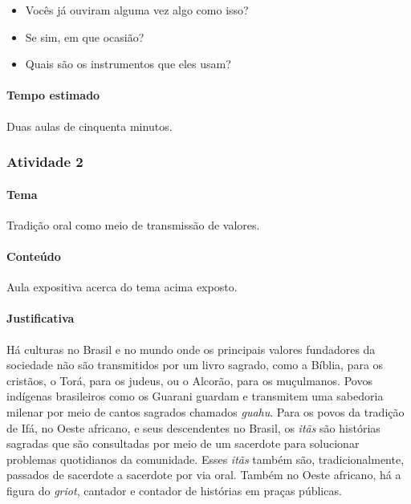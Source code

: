 \documentclass[11pt]{extarticle}
\begin{document}
\begin{itemize}
\item Vocês já ouviram alguma vez algo como isso?
\item Se sim, em que ocasião?
\item Quais são os instrumentos que eles usam?
\end{itemize}

\paragraph{Tempo estimado} Duas aulas de cinquenta minutos.



\subsubsection{Atividade 2} 

\paragraph{Tema} Tradição oral como meio de transmissão de valores.

\paragraph{Conteúdo} Aula expositiva acerca do tema acima exposto. 

\paragraph{Justificativa} Há culturas no Brasil e no mundo onde os principais valores fundadores
da sociedade não são transmitidos por um livro sagrado, como a Bíblia, para os cristãos, 
o Torá, para os judeus, ou o Alcorão, para os muçulmanos. Povos indígenas brasileiros 
como os Guarani guardam e transmitem uma sabedoria milenar por meio de cantos
sagrados chamados \textit{guahu}. Para os povos da tradição de Ifá, no Oeste africano,
e seus descendentes no Brasil, os \textit{itãs} são histórias sagradas que são consultadas
por meio de um sacerdote para solucionar problemas quotidianos da comunidade. 
Esses \textit{itãs} também são, tradicionalmente, passados de sacerdote a sacerdote 
por via oral. Também no Oeste africano, há a figura do \textit{griot}, cantador e contador de histórias
em praças públicas. 

\end{document}
